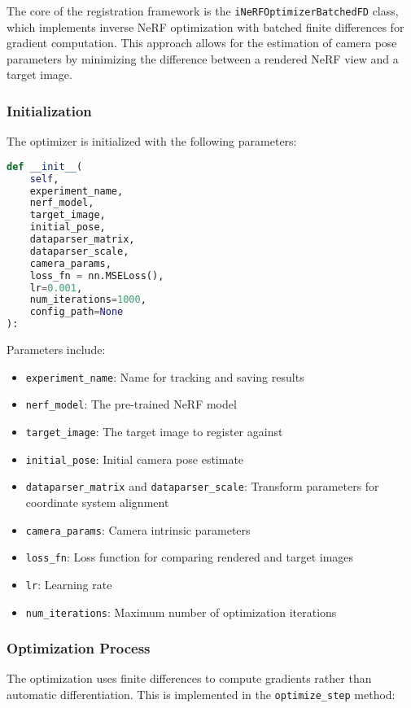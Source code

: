 The core of the registration framework is the \texttt{iNeRFOptimizerBatchedFD} class, which implements inverse NeRF optimization with batched finite differences for gradient computation. This approach allows for the estimation of camera pose parameters by minimizing the difference between a rendered NeRF view and a target image.

\subsubsection{Initialization}

The optimizer is initialized with the following parameters:

\begin{lstlisting}[language=Python]
def __init__(
    self,
    experiment_name, 
    nerf_model, 
    target_image,
    initial_pose,
    dataparser_matrix,
    dataparser_scale,
    camera_params,
    loss_fn = nn.MSELoss(),
    lr=0.001,
    num_iterations=1000,
    config_path=None
):
\end{lstlisting}

Parameters include:
\begin{itemize}
    \item \texttt{experiment\_name}: Name for tracking and saving results
    \item \texttt{nerf\_model}: The pre-trained NeRF model
    \item \texttt{target\_image}: The target image to register against
    \item \texttt{initial\_pose}: Initial camera pose estimate
    \item \texttt{dataparser\_matrix} and \texttt{dataparser\_scale}: Transform parameters for coordinate system alignment
    \item \texttt{camera\_params}: Camera intrinsic parameters
    \item \texttt{loss\_fn}: Loss function for comparing rendered and target images
    \item \texttt{lr}: Learning rate
    \item \texttt{num\_iterations}: Maximum number of optimization iterations
\end{itemize}

\subsubsection{Optimization Process}

The optimization uses finite differences to compute gradients rather than automatic differentiation. This is implemented in the \texttt{optimize\_step} method:

